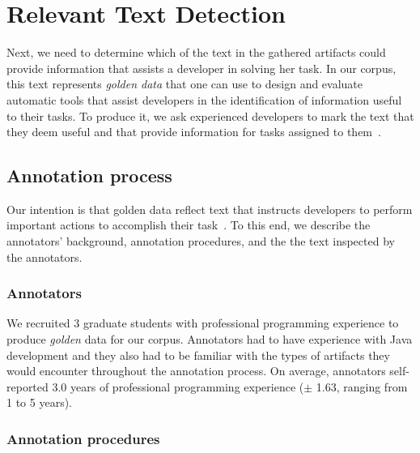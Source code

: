 


\section{Relevant Text Detection}
\label{cp4:corpus-relevant-text}






Next, we need to determine which 
of the text in the gathered artifacts could provide information that assists a developer in solving her task.
In our corpus, this text represents \textit{golden data} that one can use to design and evaluate automatic tools that assist developers in the identification of information useful to their tasks. 
To produce it, we 
ask experienced developers to
mark the text that they deem useful and that provide information for tasks assigned to them~\cite{nadi2020, Robillard2015, marques2020}.



\subsection{Annotation process}


Our intention is that golden data reflect text that instructs developers to perform important actions to accomplish their task~\cite{Robillard2015, Lotufo2012}.
To this end, we describe the annotators' background, annotation procedures, and the 
the text inspected by the annotators.
\textcolor{white}{\acs{stdv}} %





\subsubsection{Annotators}


We recruited 3 graduate students with professional programming experience to produce \textit{golden} data for our corpus. Annotators had to have experience with Java development and they also had to be familiar with the types of artifacts they would encounter throughout the annotation process. 
On average, annotators self-reported 3.0 years of professional
programming experience ({\small $\pm$} 1.63, ranging from 1 to 5 years).



\subsubsection{Annotation procedures}




